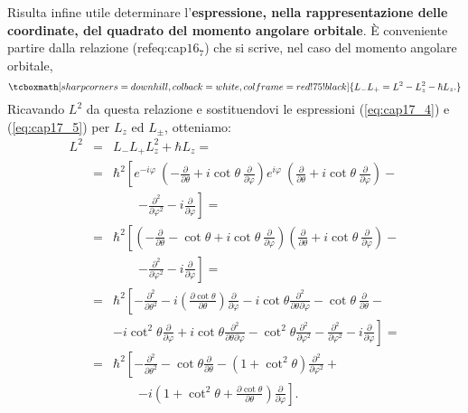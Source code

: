\documentclass[a4paper,12pt,oneside]{book}
\begin{document}
Risulta infine utile determinare l'\textbf{espressione, nella rappresentazione delle coordinate, del quadrato del momento angolare orbitale}. È conveniente partire dalla relazione (refeq:cap$16_7$) che si scrive, nel caso del momento angolare orbitale,
	\begin{equation}
		\tcboxmath[sharp corners=downhill, colback=white, colframe=red!75!black]{
			L_- L_+ = L^2 -L_z ^2 -\hbar L_z .
			}
	\end{equation}
Ricavando $L^2$ da questa relazione e sostituendovi le espressioni (\ref{eq:cap17_4}) e (\ref{eq:cap17_5}) per $L_z$ ed $L_{\pm}$, otteniamo:
\begin{eqnarray}
L^2 &=& L_-L_+ L_z^2 +\hbar L_z = \nonumber \\
&=& \hbar ^2 \left[e^{-i\varphi}\ \left(-\frac{\partial}{\partial \theta}+i \cot \theta\ \frac{\partial}{\partial \varphi}\right)e^{i\varphi}\ \left(\frac{\partial}{\partial \theta}+i \cot \theta\ \frac{\partial}{\partial \varphi}\right)-\right. \nonumber \\
& &\qquad \left. -\frac{\partial ^2}{\partial \varphi ^2}- i\frac{\partial}{\partial \varphi}\right] = \nonumber \\
&=&\hbar ^ 2 \left[ \left( -\frac{\partial}{\partial \theta}-\cot\theta +i \cot\theta\ \frac{\partial}{\partial \varphi}\right)\left(\frac{\partial}{\partial \theta}+i \cot \theta \ \frac{\partial}{\partial \varphi}\right)-\right. \nonumber \\
& &\qquad \left. -\frac{\partial ^2}{\partial \varphi ^2}- i\frac{\partial}{\partial \varphi}\right] = \nonumber \\
&=& \hbar ^2 \left[ -\frac{\partial ^2}{\partial \theta ^2}-i\left( \frac{\partial \cot \theta}{\partial \theta}\right) \frac{\partial }{\partial \varphi }-i\cot \theta \frac{\partial ^2}{\partial \theta \partial \varphi}-\cot \theta\ \frac{\partial }{\partial \theta}-\right. \nonumber \\
& & \left. -i \cot ^2 \theta \frac{\partial }{\partial \varphi}+i \cot\theta \frac{\partial ^2}{\partial \theta \partial \varphi}-\cot ^2 \theta \frac{\partial ^2}{\partial \varphi ^2}-\frac{\partial ^2}{\partial \varphi ^2}-i\frac{\partial }{\partial \varphi}\right] = \nonumber \\
&=& \hbar^2 \left[ -\frac{\partial ^2}{\partial \theta ^2}-\cot \theta \frac{\partial }{\partial \theta}-\left(1+ \cot ^2 \theta\right) \frac{\partial ^2}{\partial \varphi ^2}+\right. \nonumber \\
& &\qquad \left. -i\left( 1+\cot ^2 \theta +\frac{\partial \cot \theta}{\partial \theta}\right)\frac{\partial}{\partial \varphi}\right] .
\end{eqnarray}
\end{document}
